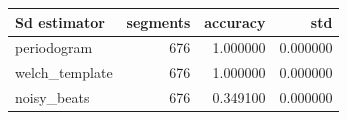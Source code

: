 \begin{tabular}{lrrr}
\toprule
Sd estimator & segments & accuracy & std \\
\midrule
periodogram & 676 & 1.000000 & 0.000000 \\
welch_template & 676 & 1.000000 & 0.000000 \\
noisy_beats & 676 & 0.349100 & 0.000000 \\
\bottomrule
\end{tabular}
